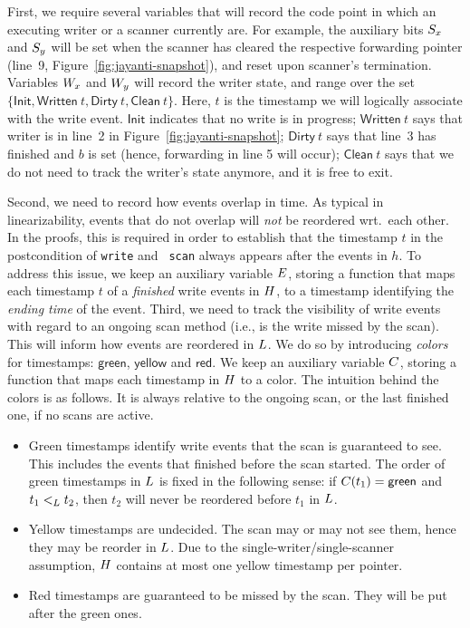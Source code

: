 First, we require several variables that will record the code point in
which an executing writer or a scanner currently are. For example, the
auxiliary bits $S_x$ and $S_y$ will be set when the scanner has
cleared the respective forwarding pointer (line~9,
Figure~\ref{fig:jayanti-snapshot}), and reset upon scanner's
termination. Variables $W_x$ and $W_y$ will record the writer state,
and range over the set $\{ \mathsf{Init}, \mathsf{Written}\ t,
\mathsf{Dirty}\ t, \mathsf{Clean}\ t\}$. Here, $t$ is the timestamp we
will logically associate with the write event. $\mathsf{Init}$
indicates that no write is in progress; $\mathsf{Written}\ t$ says
that writer is in line~2 in Figure~\ref{fig:jayanti-snapshot};
$\mathsf{Dirty}\ t$ says that line~3 has finished and $b$ is set
(hence, forwarding in line 5 will occur); $\mathsf{Clean}\ t$ says
that we do not need to track the writer's state anymore, and it is
free to exit.

%
Second, we need to record how events overlap in time. As typical in
linearizability, events that do not overlap will \emph{not} be reordered
wrt.~each other. In the proofs, this is required in order to establish
that the timestamp $t$ in the postcondition of {\tt write} and {\tt
  scan} always appears after the events in $h$. To address this issue,
we keep an auxiliary variable $E$, storing a function that maps each
timestamp $t$ of a \emph{finished} write events in $H$, to a
timestamp identifying the \emph{ending time} of the event.
%
Third, we need to track the visibility of write events with regard to
an ongoing scan method (i.e., is the write missed by the scan). This
will inform how events are reordered in $L$. We do so by
introducing \emph{colors} for timestamps: $\mathsf{green}$,
$\mathsf{yellow}$ and $\mathsf{red}$. We keep an auxiliary variable
$C$, storing a function that maps each timestamp in $H$ to a
color.
%
The intuition behind the colors is as follows. It is always relative
to the ongoing scan, or the last finished one, if no scans are active.
%
\begin{itemize}
\item Green timestamps identify write events that the scan is
  guaranteed to see. This includes the events that finished before the
  scan started. The order of green timestamps in $L$ is fixed
  in the following sense: if $C(t_1) = \mathsf{green}$ and
  $t_1 \mathrel{<_L} t_2$, then $t_2$ will never be reordered before $t_1$ in
  $L$.

\item Yellow timestamps are undecided. The scan may or may not see
  them, hence they may be reorder in $L$. Due to the
  single-writer/single-scanner assumption, $H$ contains at most
  one yellow timestamp per pointer.

\item Red timestamps are guaranteed to be missed by the scan. They
  will be put after the green ones.
\end{itemize}
%

